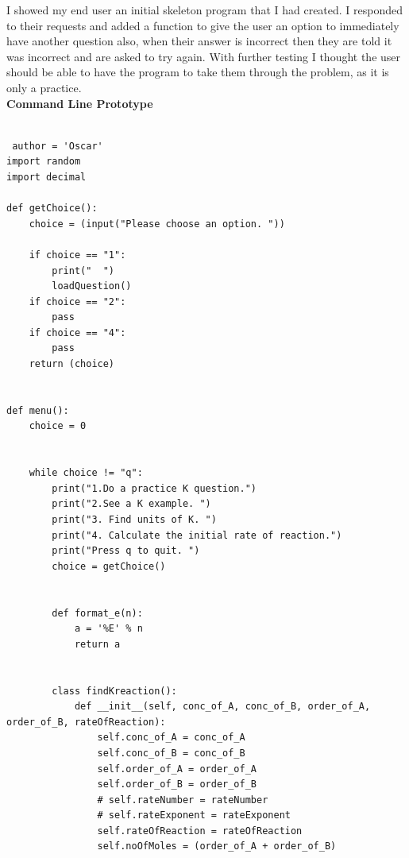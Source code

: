 \documentclass[a4paper,12pt]{report}
\begin{document}
I showed my end user an initial skeleton program that I had created. I responded to their requests and added a function to give the user an option to immediately have another question also, when their answer is incorrect then they are told it was incorrect and are asked to try again. With further testing I thought the user should be able to have the program to take them through the problem, as it is only a practice.\\
\textbf{Command Line Prototype}
\begin{verbatim}

 author = 'Oscar'
import random
import decimal

def getChoice():
    choice = (input("Please choose an option. "))

    if choice == "1":
        print("  ")
        loadQuestion()
    if choice == "2":
        pass
    if choice == "4":
        pass
    return (choice)


def menu():
    choice = 0


    while choice != "q":
        print("1.Do a practice K question.")
        print("2.See a K example. ")
        print("3. Find units of K. ")
        print("4. Calculate the initial rate of reaction.")
        print("Press q to quit. ")
        choice = getChoice()
        
        
        def format_e(n):
            a = '%E' % n
            return a
        
        
        class findKreaction():
            def __init__(self, conc_of_A, conc_of_B, order_of_A, order_of_B, rateOfReaction):
                self.conc_of_A = conc_of_A
                self.conc_of_B = conc_of_B
                self.order_of_A = order_of_A
                self.order_of_B = order_of_B
                # self.rateNumber = rateNumber
                # self.rateExponent = rateExponent
                self.rateOfReaction = rateOfReaction
                self.noOfMoles = (order_of_A + order_of_B)
                

\end{verbatim}
\end{document}
